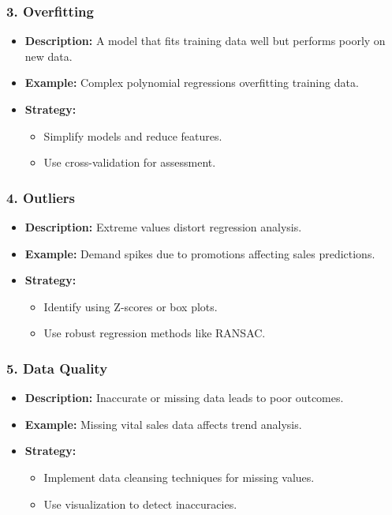 \documentclass[aspectratio=169]{beamer}
\begin{document}
\begin{frame}[fragile]
    \frametitle{3. Overfitting}
    \begin{itemize}
        \item \textbf{Description:} A model that fits training data well but performs poorly on new data.
        \item \textbf{Example:} Complex polynomial regressions overfitting training data.
        \item \textbf{Strategy:}
        \begin{itemize}
            \item Simplify models and reduce features.
            \item Use cross-validation for assessment.
        \end{itemize}
    \end{itemize}
\end{frame}

\begin{frame}[fragile]
    \frametitle{4. Outliers}
    \begin{itemize}
        \item \textbf{Description:} Extreme values distort regression analysis.
        \item \textbf{Example:} Demand spikes due to promotions affecting sales predictions.
        \item \textbf{Strategy:}
        \begin{itemize}
            \item Identify using Z-scores or box plots.
            \item Use robust regression methods like RANSAC.
        \end{itemize}
    \end{itemize}
\end{frame}

\begin{frame}[fragile]
    \frametitle{5. Data Quality}
    \begin{itemize}
        \item \textbf{Description:} Inaccurate or missing data leads to poor outcomes.
        \item \textbf{Example:} Missing vital sales data affects trend analysis.
        \item \textbf{Strategy:}
        \begin{itemize}
            \item Implement data cleansing techniques for missing values.
            \item Use visualization to detect inaccuracies.
        \end{itemize}
    \end{itemize}
\end{frame}
\end{document}

